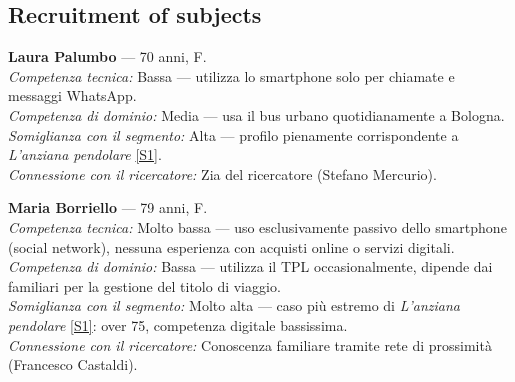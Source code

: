 ﻿\documentclass[11pt,a4paper]{article}
\begin{document}
\vspace{0.2cm}

\subsection*{Recruitment of subjects}
\begin{tcolorbox}[base]

\textbf{Laura Palumbo} --- 70 anni, F.\\[0.3cm]
\textit{Competenza tecnica:} Bassa --- utilizza lo smartphone
solo per chiamate e messaggi WhatsApp.\\[0.2cm]
\textit{Competenza di dominio:} Media --- usa il bus urbano
quotidianamente a Bologna.\\[0.2cm]
\textit{Somiglianza con il segmento:} Alta --- profilo
pienamente corrispondente a \textit{L'anziana pendolare}
\hyperref[seg:anziana]{[S1]}.\\[0.2cm]
\textit{Connessione con il ricercatore:} Zia del ricercatore
(Stefano Mercurio).

\vspace{0.2cm}

\textbf{Maria Borriello} --- 79 anni, F.\\[0.3cm]
\textit{Competenza tecnica:} Molto bassa --- uso esclusivamente
passivo dello smartphone (social network), nessuna esperienza
con acquisti online o servizi digitali.\\[0.2cm]
\textit{Competenza di dominio:} Bassa --- utilizza il TPL
occasionalmente, dipende dai familiari per la gestione del
titolo di viaggio.\\[0.2cm]
\textit{Somiglianza con il segmento:} Molto alta --- caso più
estremo di \textit{L'anziana pendolare} \hyperref[seg:anziana]{[S1]}:
over 75, competenza digitale bassissima.\\[0.2cm]
\textit{Connessione con il ricercatore:} Conoscenza familiare
tramite rete di prossimità (Francesco Castaldi).

\end{tcolorbox}

\vspace{0.2cm}
\end{document}
